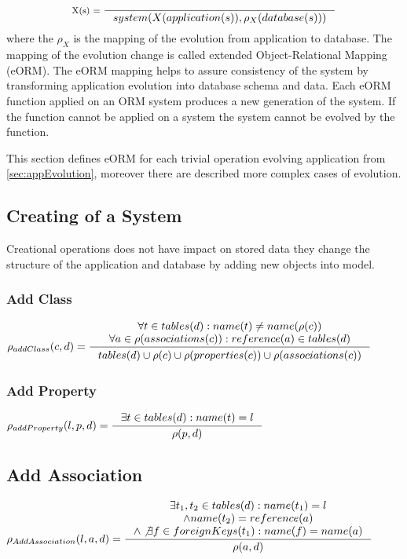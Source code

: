 \documentclass[11pt]{article}
\begin{document}
$$
\inference[X(s) = ]{}{system(X(application(s)), \rho_{X}(database(s))) }
$$
where the $\rho_X$ is the mapping of the evolution from application to database. The mapping of the evolution change is called extended Object-Relational Mapping (eORM). The eORM mapping helps to assure consistency of the system by transforming application evolution into database schema and data. Each eORM function applied on an ORM system produces a new generation of the system. If the function cannot be applied on a system the system cannot be evolved by the function. 

This section defines eORM for each trivial operation evolving application from \ref{sec:appEvolution}, moreover there are described more complex cases of evolution. 
 

\subsection{Creating of a System}
Creational operations does not have impact on stored data they change the structure of the application and database by adding new objects into model.

\subsubsection{Add Class}

$
\rho_{addClass}(c, d) = \inference{\forall t \in tables(d) : name(t) \neq name(\rho(c)) \\
	\forall a \in \rho(associations(c)) : reference(a) \in tables(d) 
}{ %
\begin{gathered}
tables(d) \cup \rho(c) \cup \rho(properties(c)) \cup \rho(associations(c))
\end{gathered}
}
$
\subsubsection{Add Property}
$
\rho_{addProperty}(l, p, d) = 
\inference{\exists t \in tables(d) : name(t) = l}{\rho(p,d)} 
$
\subsection{Add Association}
$
\rho_{AddAssociation}(l, a, d) = \inference{\exists t_1, t_2 \in tables(d) : name(t_1) = l \\ \wedge name(t_2) = reference(a) \\ \wedge \not \exists f \in foreignKeys(t_1) : name(f) = name(a) }{\rho(a,d)}
$
\end{document}
